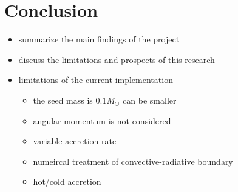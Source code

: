 \documentclass[12pt,a4paper]{article}
\newenvironment{outline}[1]{%
  \begin{itemize}[label=\textbullet]%
  \color{#1}%
}{%
  \end{itemize}%
}
\begin{document}
\section{Conclusion}
\label{sec:conclusion}

\begin{outline}{gray}
  \item summarize the main findings of the project
  \item discuss the limitations and prospects of this research
  \item limitations of the current implementation
  \begin{itemize}
    \item the seed mass is $0.1 M_\odot$ can be smaller
    \item angular momentum is not considered
    \item variable accretion rate
    \item numeircal treatment of convective-radiative boundary
    \item hot/cold accretion
  \end{itemize}
\end{outline}



\end{document}
